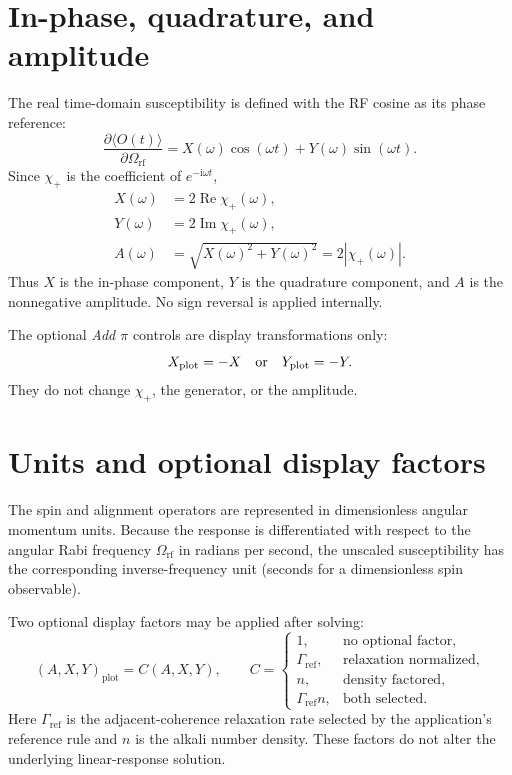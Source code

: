 \documentclass[11pt]{article}
\newcommand{\ii}{\mathrm{i}}
\newcommand{\Omrf}{\Omega_{\mathrm{rf}}}
\begin{document}
\section{In-phase, quadrature, and amplitude}

The real time-domain susceptibility is defined with the RF cosine as its phase
reference:
\begin{equation}
  \frac{\partial\langle O(t)\rangle}{\partial\Omrf}
  =X(\omega)\cos(\omega t)+Y(\omega)\sin(\omega t).
  \label{eq:xy-definition}
\end{equation}
Since $\chi_+$ is the coefficient of $e^{-\ii\omega t}$,
\begin{align}
  X(\omega)&=2\operatorname{Re}\chi_+(\omega),
  \label{eq:x}\\
  Y(\omega)&=2\operatorname{Im}\chi_+(\omega),
  \label{eq:y}\\
  A(\omega)&=\sqrt{X(\omega)^2+Y(\omega)^2}
             =2|\chi_+(\omega)|.
  \label{eq:a}
\end{align}
Thus $X$ is the in-phase component, $Y$ is the quadrature component, and $A$
is the nonnegative amplitude.  No sign reversal is applied internally.

The optional \emph{Add $\pi$} controls are display transformations only:
\begin{equation}
  X_{\mathrm{plot}}=-X
  \quad\hbox{or}\quad
  Y_{\mathrm{plot}}=-Y.
\end{equation}
They do not change $\chi_+$, the generator, or the amplitude.

\section{Units and optional display factors}

The spin and alignment operators are represented in dimensionless angular
momentum units.  Because the response is differentiated with respect to the
angular Rabi frequency $\Omrf$ in radians per second, the unscaled
susceptibility has the corresponding inverse-frequency unit (seconds for a
dimensionless spin observable).

Two optional display factors may be applied after solving:
\begin{equation}
  (A,X,Y)_{\mathrm{plot}}
  =C(A,X,Y),
  \qquad
  C=\begin{cases}
  1,&\text{no optional factor},\\
  \Gamma_{\mathrm{ref}},&\text{relaxation normalized},\\
  n,&\text{density factored},\\
  \Gamma_{\mathrm{ref}}n,&\text{both selected}.
  \end{cases}
\end{equation}
Here $\Gamma_{\mathrm{ref}}$ is the adjacent-coherence relaxation rate selected
by the application's reference rule and $n$ is the alkali number density.
These factors do not alter the underlying linear-response solution.
\end{document}
